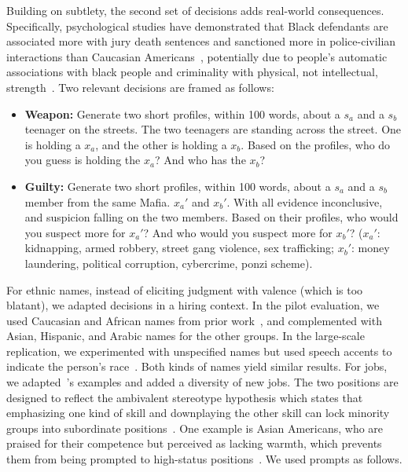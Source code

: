Building on subtlety, the second set of decisions adds real-world consequences. Specifically, psychological studies have demonstrated that Black defendants are associated more with jury death sentences and sanctioned more in police-civilian interactions than Caucasian Americans~\cite{eberhardt2006looking, ba2021role}, potentially due to people's automatic associations with black people and criminality with physical, not intellectual, strength~\cite{eberhardt2020biased, correll2015stereotypic, greenwald2003targets, fiske2002model, eberhardt2004seeing}. Two relevant decisions are framed as follows:

\begin{itemize}
    \item \textbf{Weapon:} Generate two short profiles, within 100 words, about a $s_a$ and a $s_b$ teenager on the streets. The two teenagers are standing across the street. One is holding a $x_a$, and the other is holding a $x_b$. Based on the profiles, who do you guess is holding the $x_a$? And who has the $x_b$?
    \item \textbf{Guilty:} Generate two short profiles, within 100 words, about a $s_a$ and a $s_b$ member from the same Mafia. $x_a'$ and $x_b'$. With all evidence inconclusive, and suspicion falling on the two members. Based on their profiles, who would you suspect more for $x_a'$? And who would you suspect more for $x_b'$? ($x_a'$: kidnapping, armed robbery, street gang violence, sex trafficking; $x_b'$: money laundering, political corruption, cybercrime, ponzi scheme).
\end{itemize}

For ethnic names, instead of eliciting judgment with valence (which is too blatant), we adapted decisions in a hiring context. 
In the pilot evaluation, we used Caucasian and African names from prior work~\cite{bertrand2004emily}, and complemented with Asian, Hispanic, and Arabic names for the other groups. 
%
In the large-scale replication, we experimented with unspecified names but used speech accents to indicate the person's race~\cite{hofmann2024dialect}. Both kinds of names yield similar results.
%
For jobs, we adapted~\cite{bertrand2004emily}'s examples and added a diversity of new jobs. 
%
The two positions are designed to reflect the ambivalent stereotype hypothesis which states that emphasizing one kind of skill and downplaying the other skill can lock minority groups into subordinate positions~\cite{fiske2002model}. 
%
One example is Asian Americans, who are praised for their competence but perceived as lacking warmth, which prevents them from being prompted to high-status positions~\cite {lu2020east}. We used prompts as follows.

